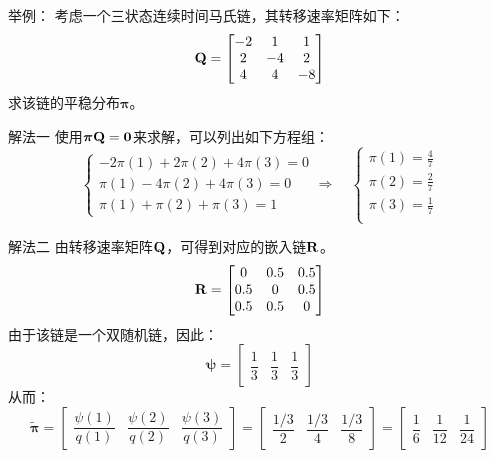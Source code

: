 \documentclass[t]{beamer}
\begin{document}
\begin{frame}{举例：}
  考虑一个三状态连续时间马氏链，其转移速率矩阵如下：
	\[{\bf Q}=\begin{bmatrix}
	-2 & 1 &1\\
	2 & -4 &2\\
	4 & 4 &-8\\
	\end{bmatrix} \]
	求该链的平稳分布$\bm{\pi}$。
\end{frame}




\begin{frame}{解法一}
  使用${\bm{\pi}}{\bf Q}={\bf 0}$来求解，可以列出如下方程组：
	\[\begin{cases}
	-2\pi(1)+2\pi(2)+4\pi(3)=0\\
	\pi(1)-4\pi(2)+4\pi(3)=0\\
	\pi(1)+\pi(2)+\pi(3)=1
	\end{cases}\Rightarrow\quad \begin{cases}
	\pi(1)=\frac{4}{7}\\
 	\pi(2)=\frac{2}{7}\\
	\pi(3)=\frac{1}{7}\\
	\end{cases} \]
\end{frame}


\begin{frame}{解法二}
  由转移速率矩阵${\bf Q}$，可得到对应的嵌入链${\bf R}$。
	\[{\bf R}=\begin{bmatrix}
	0 & 0.5 & 0.5\\
	0.5 & 0 & 0.5\\
	0.5 & 0.5 & 0\\
	\end{bmatrix} \]
	由于该链是一个双随机链，因此：$$\bm{\psi}=\begin{bmatrix}
	\dfrac{1}{3}&\dfrac{1}{3}&\dfrac{1}{3}
	\end{bmatrix}$$
从而：
	\[\widetilde{\bm{\pi}}=\begin{bmatrix}
	\dfrac{\psi(1)}{q(1)} & \dfrac{\psi(2)}{q(2)} & \dfrac{\psi(3)}{q(3)}
	\end{bmatrix}=\begin{bmatrix}
		\dfrac{1/3}{2}&\dfrac{1/3}{4}&\dfrac{1/3}{8}
	\end{bmatrix}=\begin{bmatrix}
		\dfrac{1}{6} & \dfrac{1}{12} & \dfrac{1}{24}
  \end{bmatrix} \]
\end{frame}
\end{document}
